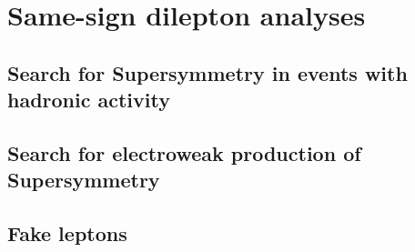 \chapter{Same-sign dilepton analyses}
\label{ch:analysis}

\section{Search for Supersymmetry in events with hadronic activity}
\label{sec:ra5}
\section{Search for electroweak production of Supersymmetry}
\label{sec:ewino}

\section{Fake leptons}
\label{sec:fakes}
